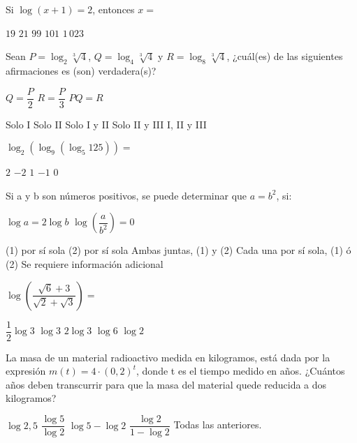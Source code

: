 \documentclass[]{srs}
\begin{document}
\begin{preguntas}
\pregunta Si $\log \left(x + 1\right) = 2$, entonces $x =$
\begin{vertical}
\alternativa $19$
\alternativa $21$
\alternativa $99$
\alternativa $101$
\alternativa $1\,023$
\end{vertical}

\pregunta Sean $P = \log_2 \sqrt[3]{4}$, $Q = \log_4 \sqrt[3]{4}$ y $R = \log_8 \sqrt[3]{4}$, ¿cuál(es) de las siguientes afirmaciones es (son) verdadera(s)?
\begin{verticali}
\alternativa $Q = \dfrac{P}{2}$
\alternativa $R = \dfrac{P}{3}$
\alternativa $PQ = R$
\end{verticali}
\begin{vertical}
\alternativa Solo I
\alternativa Solo II
\alternativa Solo I y II
\alternativa Solo II y III
\alternativa I, II y III
\end{vertical}




\pregunta $\log_2 \left(\log_9 \left(\log_5 125\right)\right) =$
\begin{vertical}
\alternativa $2$
\alternativa $-2$
\alternativa $1$
\alternativa $-1$
\alternativa $0$
\end{vertical}

\pregunta Si a y b son números positivos, se puede determinar que $a = b^2$, si:
\begin{verticaln}
\alternativa $\log a = 2 \log b$
\alternativa $\log \left(\dfrac{a}{b^2}\right) = 0$
\end{verticaln}
\begin{vertical}
\alternativa (1) por sí sola
\alternativa (2) por sí sola
\alternativa Ambas juntas, (1) y (2)
\alternativa Cada una por sí sola, (1) ó (2)
\alternativa Se requiere información adicional
\end{vertical}

\pregunta $\log \left(\dfrac{\sqrt{6} + 3}{\sqrt{2} + \sqrt{3}}\right) =$
\begin{vertical}
\alternativa $\dfrac{1}{2} \log 3$
\alternativa $\log 3$
\alternativa $2 \log 3$
\alternativa $\log 6$
\alternativa $\log 2$
\end{vertical}

\pregunta La masa de un material radioactivo medida en kilogramos, está dada por la expresión $m\left(t\right) = 4 \cdot \left(0,2\right)^t$, donde t es el tiempo medido en años. ¿Cuántos años deben transcurrir para que la masa del material quede reducida a dos kilogramos?
\begin{vertical}
\alternativa $\log 2,5$
\alternativa $\dfrac{\log 5}{\log 2}$
\alternativa $\log 5 - \log 2$
\alternativa $\dfrac{\log 2}{1 - \log 2}$
\alternativa Todas las anteriores.
\end{vertical}


\end{preguntas}
\end{document}
